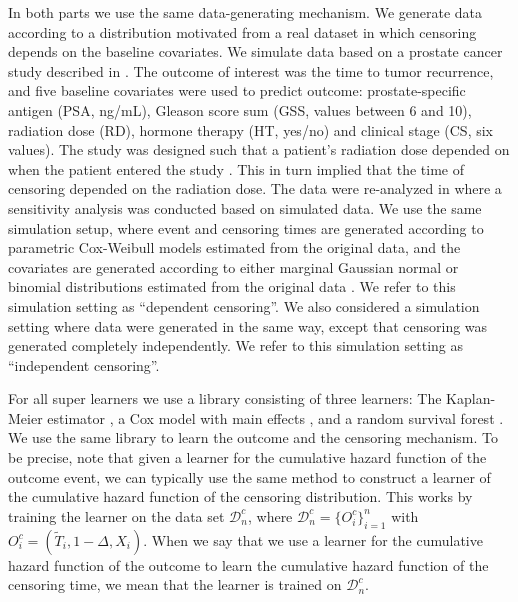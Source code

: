 \documentclass[numsec,webpdf,contemporary,medium,namedate]{oup-authoring-template}%
\theoremstyle{thmstyleone}%
\theoremstyle{thmstyletwo}%
\theoremstyle{thmstylethree}%
\newcommand{\1}{\mathds{1}}
\newcommand{\data}{\ensuremath{\mathcal{D}}}
\begin{document}
In both parts we use the same data-generating mechanism. We generate
data according to a distribution motivated from a real dataset in
which censoring depends on the baseline covariates. We simulate data
based on a prostate cancer study described in
\citep{kattan2000pretreatment}. The outcome of interest was the time
to tumor recurrence, and five baseline covariates were used to predict
outcome: prostate-specific antigen (PSA, ng/mL), Gleason score sum
(GSS, values between 6 and 10), radiation dose (RD), hormone therapy
(HT, yes/no) and clinical stage (CS, six values). The study was
designed such that a patient's radiation dose depended on when the
patient entered the study \citep{gerds2013estimating}. This in turn
implied that the time of censoring depended on the radiation dose. The
data were re-analyzed in \citep{gerds2013estimating} where a
sensitivity analysis was conducted based on simulated data. We use the
same simulation setup, where event and censoring times are generated
according to parametric Cox-Weibull models estimated from the original
data, and the covariates are generated according to either marginal
Gaussian normal or binomial distributions estimated from the original
data \citep[c.f.,][Section~4.6]{gerds2013estimating}. We refer to this
simulation setting as ``dependent censoring''. We also considered a
simulation setting where data were generated in the same way, except
that censoring was generated completely independently. We refer to
this simulation setting as ``independent censoring''.

For all super learners we use a library consisting of three learners: The
Kaplan-Meier estimator \citep{kaplan1958nonparametric,Gerds_2019prodlim}, a Cox
model with main effects \citep{cox1972regression, survival-package}, and a
random survival forest \citep{ishwaran2008random,rfsrc-paclage}. We use the same
library to learn the outcome and the censoring mechanism. To be precise, note
that given a learner for the cumulative hazard function of the outcome event, we
can typically use the same method to construct a learner of the cumulative
hazard function of the censoring distribution. This works by training the
learner on the data set \( \data_n^c \), where
\( \data_n^c = \{O_i^c\}_{i=1}^n \) with
\( O_i^c = (\tilde{T}_i, 1-\Delta, X_i) \). When we say that we use a learner
for the cumulative hazard function of the outcome to learn the cumulative hazard
function of the censoring time, we mean that the learner is trained on
\( \data_n^c \).
\end{document}
